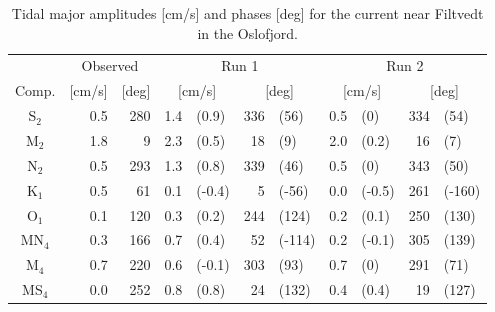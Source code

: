 \begin{table}[ht]
\caption{Tidal major amplitudes [cm/s] and phases [deg] for the current near Filtvedt in the Oslofjord.}
\label{tab:Filtvedt}
\centering
\begin{tabular}{crrr@{ }lr@{ }lr@{ }lr@{ }l} \hline
      & \multicolumn{2}{c}{Observed} & \multicolumn{4}{c}{Run 1} & \multicolumn{4}{c}{Run 2} \\%
Comp. & [cm/s] & [deg] & \multicolumn{2}{c}{[cm/s]} & \multicolumn{2}{c}{[deg]} & \multicolumn{2}{c}{[cm/s]} & \multicolumn{2}{c}{[deg]} \\ \hline %
S$_2$   &  0.5 & 280  &   1.4 & (0.9)  & 336 & (56)   &  0.5 & (0)    & 334 & (54)   \\ %
M$_2$   &  1.8 &   9  &   2.3 & (0.5)  &  18 & (9)    &  2.0 & (0.2)  &  16 & (7)    \\ %
N$_2$   &  0.5 & 293  &   1.3 & (0.8)  & 339 & (46)   &  0.5 & (0)    & 343 & (50)   \\ %
K$_1$   &  0.5 &  61  &   0.1 & (-0.4) &   5 & (-56)  &  0.0 & (-0.5) & 261 & (-160) \\ %
O$_1$   &  0.1 & 120  &   0.3 & (0.2)  & 244 & (124)  &  0.2 & (0.1)  & 250 & (130)  \\ %
MN$_4$  &  0.3 & 166  &   0.7 & (0.4)  &  52 & (-114) &  0.2 & (-0.1) & 305 & (139)  \\ %
M$_4$   &  0.7 & 220  &   0.6 & (-0.1) & 303 & (93)   &  0.7 & (0)    & 291 & (71)   \\ %
MS$_4$  &  0.0 & 252  &   0.8 & (0.8)  &  24 & (132)  &  0.4 & (0.4)  &  19 & (127)  \\ %
\hline 
\end{tabular}
\end{table}

